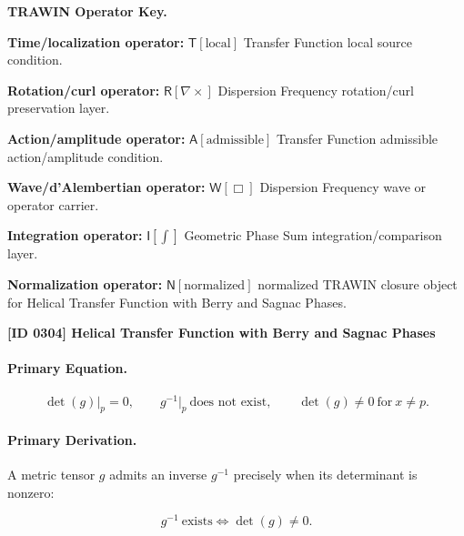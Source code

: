 \par\vspace{0.45\baselineskip}
\noindent\begin{minipage}[t]{\linewidth}
\begingroup
\small
\raggedright
\textbf{TRAWIN Operator Key.}\par
\noindent\textbf{Time/localization operator:} $\mathsf{T}\!\left[\mathrm{local}\right]$ Transfer Function local source condition.\par
\noindent\textbf{Rotation/curl operator:} $\mathsf{R}\!\left[\nabla\times\right]$ Dispersion Frequency rotation/curl preservation layer.\par
\noindent\textbf{Action/amplitude operator:} $\mathsf{A}\!\left[\mathrm{admissible}\right]$ Transfer Function admissible action/amplitude condition.\par
\noindent\textbf{Wave/d'Alembertian operator:} $\mathsf{W}\!\left[\Box\right]$ Dispersion Frequency wave or operator carrier.\par
\noindent\textbf{Integration operator:} $\mathsf{I}\!\left[\int\right]$ Geometric Phase Sum integration/comparison layer.\par
\noindent\textbf{Normalization operator:} $\mathsf{N}\!\left[\mathrm{normalized}\right]$ normalized TRAWIN closure object for Helical Transfer Function with Berry and Sagnac Phases.\par
\endgroup
\end{minipage}

\clearpage
\noindent\textbf{[ID 0304] Helical Transfer Function with Berry and Sagnac Phases}\par
\vspace{0.35em}
\paragraph{Primary Equation.}
\begin{equation}
\det(g)\big|_{p}=0,
\qquad
g^{-1}\big|_{p}\ \text{does not exist},
\qquad
\det(g)\neq 0\ \text{for}\ x\neq p .
\end{equation}

\paragraph{Primary Derivation.}
A metric tensor $g$ admits an inverse $g^{-1}$ precisely when its determinant is nonzero:

\begin{equation}
g^{-1}\ \text{exists}
\iff
\det(g)\neq 0 .
\end{equation}

